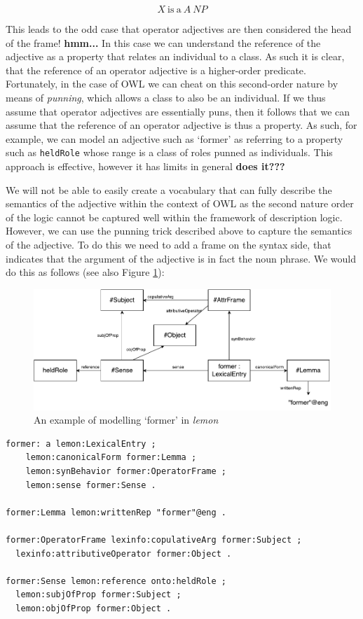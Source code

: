 \documentclass[11pt]{article}
\begin{document}
$$X\mathrm{~is~a~}A~NP$$

This leads to the odd case that operator adjectives are then considered the 
head of the frame! \textbf{hmm...} In this case 
we can understand the reference of the adjective as a property that relates an 
individual to a class. As such it is clear, that the reference of an operator 
adjective is a higher-order predicate. Fortunately, in the case of OWL we can 
cheat on this second-order nature by means of \emph{punning}, which allows a 
class to also be an individual. If we thus assume that operator adjectives are 
essentially puns, then it follows that we can assume that the reference of an 
operator adjective is thus a property. As such, for example, we can model an 
adjective such as `former' as referring to a property such as {\tt heldRole} 
whose range is a class of roles punned as individuals. This approach is 
effective, however it has limits in general \textbf{does it???}

We will not be able to easily create a vocabulary that can fully describe the 
semantics of the adjective within the context of OWL as the second nature order 
of the logic cannot be captured well within the framework of description logic. 
However, we can use the punning trick described above to capture the semantics
of the adjective. To do this we need to add a frame on the syntax side, that 
indicates that the argument of the adjective is in fact the noun phrase. We 
would do this as follows (see also Figure \ref{former-example}):

\begin{figure}
\includegraphics[width=\textwidth]{former-example}
\caption{An example of modelling `former' in \emph{lemon}\label{former-example}}
\end{figure}

\begin{verbatim}
former: a lemon:LexicalEntry ;
	lemon:canonicalForm former:Lemma ;
	lemon:synBehavior former:OperatorFrame ;
	lemon:sense former:Sense .

former:Lemma lemon:writtenRep "former"@eng .

former:OperatorFrame lexinfo:copulativeArg former:Subject ;
  lexinfo:attributiveOperator former:Object .
  
former:Sense lemon:reference onto:heldRole ;
  lemon:subjOfProp former:Subject ;
  lemon:objOfProp former:Object .
\end{verbatim}
\end{document}
